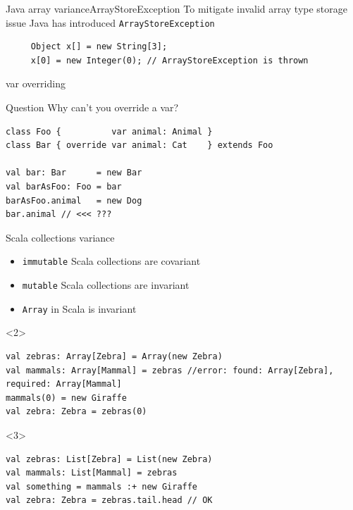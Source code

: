 \documentclass[aspectratio=169]{beamer}
\begin{document}
\begin{frame}[fragile]{Java array variance}{ArrayStoreException}
  To mitigate invalid array type storage issue Java has introduced
  \texttt{ArrayStoreException} \cite{arstex}
  \vspace{3em}
  \begin{verbatim}
     Object x[] = new String[3];
     x[0] = new Integer(0); // ArrayStoreException is thrown
  \end{verbatim}
\end{frame}

\begin{frame}[fragile]{var overriding}
\begin{block}{Question}
  Why can't you override a var?
\end{block}
\pause
\begin{verbatim}
class Foo {          var animal: Animal }
class Bar { override var animal: Cat    } extends Foo

val bar: Bar      = new Bar
val barAsFoo: Foo = bar
barAsFoo.animal   = new Dog
bar.animal // <<< ???
\end{verbatim}
\end{frame}

\begin{frame}[fragile]{Scala collections variance}
\begin{itemize}
  \item \texttt{immutable} Scala collections are \alert{covariant}
  \item \texttt{mutable} Scala collections are \alert{invariant}
  \item \texttt{Array} in Scala is \alert{invariant}
\end{itemize}
\begin{onlyenv}<2>
  \vspace{2em}
\begin{verbatim}
val zebras: Array[Zebra] = Array(new Zebra)
val mammals: Array[Mammal] = zebras //error: found: Array[Zebra], required: Array[Mammal]
mammals(0) = new Giraffe
val zebra: Zebra = zebras(0)
\end{verbatim}
\end{onlyenv}
\begin{onlyenv}<3>
  \vspace{2em}
\begin{verbatim}
val zebras: List[Zebra] = List(new Zebra)
val mammals: List[Mammal] = zebras
val something = mammals :+ new Giraffe
val zebra: Zebra = zebras.tail.head // OK
\end{verbatim}
\end{onlyenv}
\end{frame}
\end{document}
